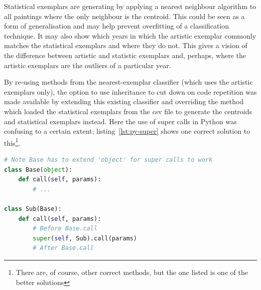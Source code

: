 Statistical exemplars are generating by applying a nearest neighbour algorithm to all paintings
where the only neighbour is the centroid. This could be seen as a form of generalisation and may
help prevent overfitting of a classification technique. It may also show which years in which
the artistic exemplar commonly matches the statistical exemplars and where they do not. This gives
a vision of the difference between artistic and statistic exemplars and, perhaps, where the 
artistic exemplars are the outliers of a particular year.



By re-using methods from the nearest-exemplar classifier (which uses the artistic exemplars only), 
the option to use inheritance to cut down on code repetition was made available by extending this
existing classifier and overriding the method which loaded the statistical exemplars from the 
\gls{csv} file to generate the centroids and statistical exemplars instead. Here the use of super 
calls in Python was confusing to a certain extent; listing~\ref{lst:py-super} shows one correct 
solution to this\footnote{There are, of course, other correct methods, but the one listed is one 
of the better solutions}.

\begin{lstlisting}[language=python, breaklines=true, label=lst:py-super, 
caption={Super method calls in Python}, frame=single]
# Note Base has to extend 'object' for super calls to work
class Base(object):
    def call(self, params):
        # ...

class Sub(Base):
    def call(self, params):
        # Before Base.call
        super(self, Sub).call(params)
        # After Base.call
\end{lstlisting}


